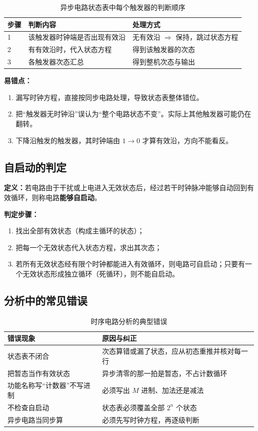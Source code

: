 \begin{table}[!htbp]
\centering
\caption{异步电路状态表中每个触发器的判断顺序}
\begin{tabular}{lll}
\toprule
步骤 & 判断内容 & 处理方式 \\
\midrule
1 & 该触发器时钟端是否出现有效沿 & 无有效沿 $\Rightarrow$ 保持，跳过状态方程 \\
2 & 有有效沿时，代入状态方程 & 得到该触发器的次态 \\
3 & 各触发器次态汇总 & 得到整机次态与输出 \\
\bottomrule
\end{tabular}
\end{table}

\noindent\textbf{易错点：}
\begin{enumerate}
    \item 漏写时钟方程，直接按同步电路处理，导致状态表整体错位。
    \item 把“触发器无时钟沿”误认为“整个电路状态不变”。实际上其他触发器可能仍在翻转。
    \item 下降沿触发的触发器，其时钟端由 $1\rightarrow0$ 才算有效沿，方向不能看反。
\end{enumerate}

\subsection{自启动的判定}
\textbf{定义：}若电路由于干扰或上电进入无效状态后，经过若干时钟脉冲能够自动回到有效循环，则称电路\textbf{能够自启动}。

\textbf{判定步骤：}
\begin{enumerate}
    \item 找出全部有效状态（构成主循环的状态）；
    \item 把每一个无效状态代入状态方程，求出其次态；
    \item 若所有无效状态经有限个时钟都能进入有效循环，则电路可自启动；只要有一个无效状态形成独立循环（死循环），则不能自启动。
\end{enumerate}

\subsection{分析中的常见错误}
\begin{table}[!htbp]
\centering
\caption{时序电路分析的典型错误}
\begin{tabular}{ll}
\toprule
错误现象 & 原因与纠正 \\
\midrule
状态表不闭合 & 次态算错或漏了状态，应从初态重推并核对每一行 \\
把暂态当作有效状态 & 异步清零的那一拍是暂态，不占计数循环 \\
功能名称写“计数器”不写进制 & 必须写出 $M$ 进制、加法还是减法 \\
不检查自启动 & 状态表必须覆盖全部 $2^n$ 个状态 \\
异步电路当同步算 & 必须先写时钟方程，再逐级判断 \\
\bottomrule
\end{tabular}
\end{table}

